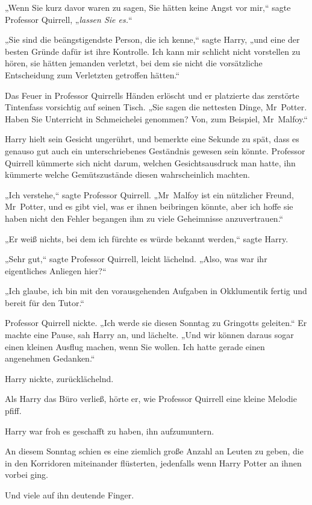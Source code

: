 {„Wenn Sie kurz davor waren zu sagen, Sie hätten keine Angst vor mir,“ sagte Professor Quirrell, „\emph{lassen Sie es.}“

„Sie sind die beängstigendste Person, die ich kenne,“ sagte Harry, „und eine der besten Gründe dafür ist ihre Kontrolle. Ich kann mir schlicht nicht vorstellen zu hören, sie hätten jemanden verletzt, bei dem sie nicht die vorsätzliche Entscheidung zum Verletzten getroffen hätten.“

Das Feuer in Professor Quirrells Händen erlöscht und er platzierte das zerstörte Tintenfass vorsichtig auf seinen Tisch. „Sie sagen die nettesten Dinge, Mr~Potter. Haben Sie Unterricht in Schmeichelei genommen? Von, zum Beispiel, Mr~Malfoy.“

Harry hielt sein Gesicht ungerührt, und bemerkte eine Sekunde zu spät, dass es genauso gut auch ein unterschriebenes Geständnis gewesen sein könnte. Professor Quirrell kümmerte sich nicht darum, welchen Gesichtsausdruck man hatte, ihn kümmerte welche Gemütszustände diesen wahrscheinlich machten.

„Ich verstehe,“ sagte Professor Quirrell. „Mr~Malfoy ist ein nützlicher Freund, Mr~Potter, und es gibt viel, was er ihnen beibringen könnte, aber ich hoffe sie haben nicht den Fehler begangen ihm zu viele Geheimnisse anzuvertrauen.“

„Er weiß nichts, bei dem ich fürchte es würde bekannt werden,“ sagte Harry.

„Sehr gut,“ sagte Professor Quirrell, leicht lächelnd. „Also, was war ihr eigentliches Anliegen hier?“

„Ich glaube, ich bin mit den vorausgehenden Aufgaben in Okklumentik fertig und bereit für den Tutor.“

Professor Quirrell nickte. „Ich werde sie diesen Sonntag zu Gringotts geleiten.“ Er machte eine Pause, sah Harry an, und lächelte. „Und wir können daraus sogar einen kleinen Ausflug machen, wenn Sie wollen. Ich hatte gerade einen angenehmen Gedanken.“

Harry nickte, zurücklächelnd.

Als Harry das Büro verließ, hörte er, wie Professor Quirrell eine kleine Melodie pfiff.

Harry war froh es geschafft zu haben, ihn aufzumuntern.

An diesem Sonntag schien es eine ziemlich große Anzahl an Leuten zu geben, die in den Korridoren miteinander flüsterten, jedenfalls wenn Harry Potter an ihnen vorbei ging.

Und viele auf ihn deutende Finger.

}
